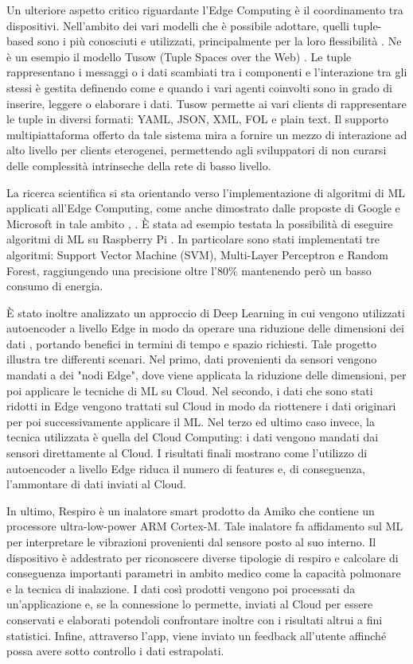 Un ulteriore aspetto critico riguardante l'Edge Computing è il coordinamento tra dispositivi. Nell'ambito dei vari modelli che è possibile adottare, quelli tuple-based sono i più conosciuti e utilizzati, principalmente per la loro flessibilità \cite{tuple}. Ne è un esempio il modello Tusow (Tuple Spaces over the Web) \cite{tusow}. Le tuple rappresentano i messaggi o i dati scambiati tra i componenti e l'interazione tra gli stessi è gestita definendo come e quando i vari agenti coinvolti sono in grado di inserire, leggere o elaborare i dati. Tusow permette ai vari clients di rappresentare le tuple in diversi formati: YAML, JSON, XML, FOL e plain text. Il supporto multipiattaforma offerto da tale sistema mira a fornire un mezzo di interazione ad alto livello per clients eterogenei, permettendo agli sviluppatori di non curarsi delle complessità intrinseche della rete di basso livello.

La ricerca scientifica si sta orientando verso l'implementazione di algoritmi di ML applicati all'Edge Computing, come anche dimostrato dalle proposte di Google e Microsoft in tale ambito \cite{tflowres}, \cite{edgemlres}.
È stata ad esempio testata la possibilità di eseguire algoritmi di ML su Raspberry Pi \cite{mlrasp}. In particolare sono stati implementati tre algoritmi: Support Vector Machine (SVM), Multi-Layer Perceptron e Random Forest, raggiungendo una precisione oltre l'80\% mantenendo però un basso consumo di energia.

È stato inoltre analizzato un approccio di Deep Learning in cui vengono utilizzati autoencoder a livello Edge in modo da operare una riduzione delle dimensioni dei dati \cite{encoder}, portando benefici in termini di tempo e spazio richiesti. Tale progetto illustra tre differenti scenari. Nel primo, dati provenienti da sensori vengono mandati a dei "nodi Edge", dove viene applicata la riduzione delle dimensioni, per poi applicare le tecniche di ML su Cloud. Nel secondo, i dati che sono stati ridotti in Edge vengono trattati sul Cloud in modo da riottenere i dati originari per poi successivamente applicare il ML. Nel terzo ed ultimo caso invece, la tecnica utilizzata è quella del Cloud Computing: i dati vengono mandati dai sensori direttamente al Cloud. I risultati finali mostrano come l'utilizzo di autoencoder a livello Edge riduca il numero di features e, di conseguenza, l'ammontare di dati inviati al Cloud.

In ultimo, Respiro è un inalatore smart prodotto da Amiko \cite{respiro} che contiene un processore ultra-low-power ARM Cortex-M. Tale inalatore fa affidamento sul ML per interpretare le vibrazioni provenienti dal sensore posto al suo interno. Il dispositivo è addestrato per riconoscere diverse tipologie di respiro e calcolare di conseguenza importanti parametri in ambito medico come la capacità polmonare e la tecnica di inalazione. I dati così prodotti vengono poi processati da un'applicazione e, se la connessione lo permette, inviati al Cloud per essere conservati e elaborati potendoli confrontare inoltre con i risultati altrui a fini statistici. Infine, attraverso l'app, viene inviato un feedback all'utente affinché possa avere sotto controllo i dati estrapolati.

